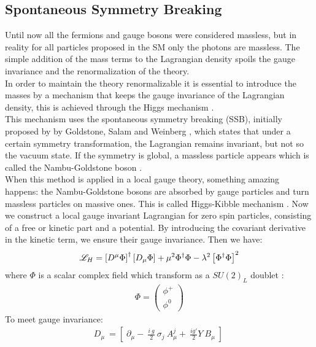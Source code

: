 \subsection{Spontaneous Symmetry Breaking}\label{QES}

Until now all the fermions and gauge bosons were considered massless, but in reality for all particles proposed in the SM only
the photons are massless. The simple addition of the mass terms to the Lagrangian density spoils the gauge invariance and the renormalization of the theory.\\
\indent
In order to maintain the theory renormalizable it is essential to introduce the masses by a mechanism that keeps the gauge invariance
of the Lagrangian density, this is achieved through the Higgs mechanism \cite{Higgs:1966ev}.\\
\indent
This mechanism uses the spontaneous symmetry breaking  (SSB), initially proposed by  by Goldstone, Salam and Weinberg \cite{PhysRev.127.965}, which states that under a certain symmetry transformation, the Lagrangian remains invariant, but not so the vacuum state. If the symmetry is global, a massless particle appears which is called the Nambu-Goldstone boson \cite{PhysRevLett.4.380,Goldstone:1961eq}.\\
\indent
When this method is applied in a local gauge theory, something amazing happens: the Nambu-Goldstone bosons are absorbed by gauge particles and turn massless particles on massive ones. This is called Higgs-Kibble mechanism \cite{Higgs:1966ev,PhysRev.155.1554}.
Now we construct a local gauge invariant Lagrangian for
zero spin particles, consisting of a free or kinetic part and a potential. By introducing the covariant derivative in the kinetic term, we ensure their gauge invariance.
Then we have:
\begin{eqnarray}
\mathscr{L}_{H}=\left[D^{\mu}\Phi\right]^{\dagger}\left[D_{\mu}\Phi\right]+\mu^{2}\Phi^{\dagger}\Phi-\lambda^{2}\left[\Phi^{\dagger}\Phi\right]^{2}
\end{eqnarray}
where $\Phi$ is a scalar complex field  which transform as a $SU(2)_{L}$ doublet :
\begin{eqnarray}
\Phi=\left(\begin{array}{c}
\phi^{+}\\
\phi^{0}
\end{array}\right)
\end{eqnarray}
To meet gauge invariance: 
\begin{eqnarray}
D_{\mu}\:=\left[\;\partial_{\mu}-\:\frac{i\:g}{2}\:\sigma_{j}\:A^{j}_{\mu}+\:\frac{ig'}{2}Y\:B_{\mu}\;\right]\:\nonumber
\end{eqnarray}
